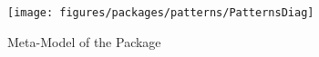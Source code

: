 %
%

\begin{figure}[htbp]
  \centering
  \texttt{[image: figures/packages/patterns/PatternsDiag]}
  \caption{Meta-Model of the  Package}
  \label{fig:MM:patterns}
\end{figure}
